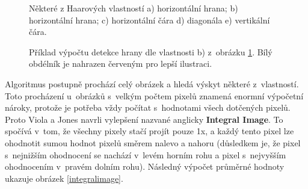 \begin{figure}[H]
  \begin{center}
  \label{haarfeatures}
  \caption{Některé z Haarových vlastností \cite{violaJonesArticle}
  a) horizontální hrana; b) horizontální hrana; c) horizontální čára d) diagonála e) vertikální čára.}
  \end{center}
\end{figure}

\begin{figure}[H]
  \begin{center}
  \label{haarexample}
  \caption{Příklad výpočtu detekce hrany dle vlastnosti b) z~obrázku \ref{haarfeatures}. Bílý obdélník je nahrazen červeným pro lepší ilustraci.}
  \end{center}
\end{figure}

Algoritmus postupně prochází celý obrázek a hledá výskyt některé z~vlastností. Toto procházení u~obrázků s~velkým počtem pixelů znamená enormní výpočetní nároky, protože je potřeba vždy počítat s~hodnotami všech dotčených pixelů. Proto Viola a Jones \cite{violaJones} navrli
vylepšení nazvané anglicky \textbf{Integral Image}. To spočívá v~tom, že všechny pixely stačí projít pouze 1x, a každý tento pixel lze ohodnotit sumou hodnot pixelů směrem nalevo a nahoru (důsledkem je, že pixel s~nejnižším ohodnocení se nachází v~levém horním rohu a pixel s~nejvyšším ohodnocením v~pravém dolním rohu). Následný výpočet průměrné hodnoty ukazuje obrázek \ref{integralimage}. 


